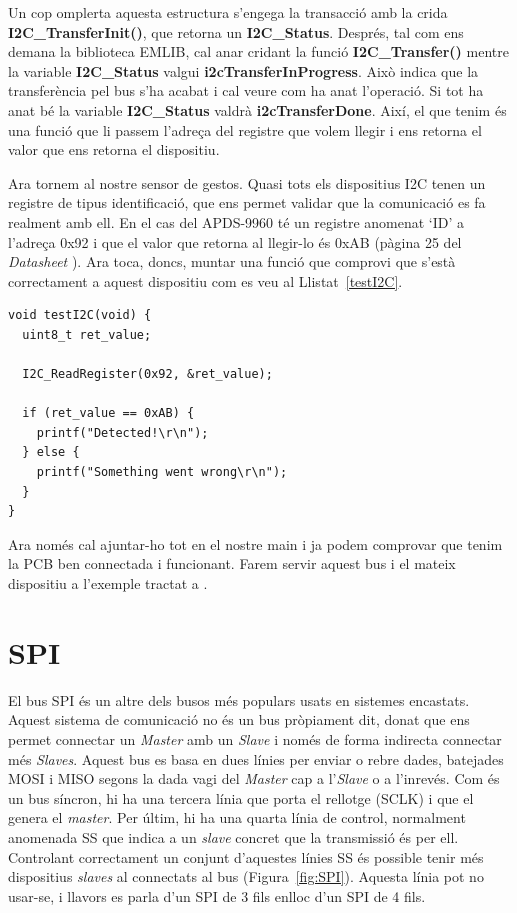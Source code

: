 Un cop omplerta aquesta estructura s'engega la transacció amb la crida {\bf I2C\_TransferInit()}, que retorna un {\bf I2C\_Status}. Després, tal com ens demana la biblioteca EMLIB, cal anar cridant la funció {\bf I2C\_Transfer()} mentre la variable {\bf I2C\_Status} valgui {\bf i2cTransferInProgress}. Això indica que la transferència pel bus s'ha acabat i cal veure com ha anat l'operació. Si tot ha anat bé la variable {\bf I2C\_Status} valdrà {\bf i2cTransferDone}. Així, el que tenim és una funció que li passem l'adreça del registre que volem llegir i ens retorna el valor que ens retorna el dispositiu.

Ara tornem al nostre sensor de gestos. Quasi tots els dispositius I2C tenen un registre de tipus identificació, que ens permet validar que la comunicació es fa realment amb ell. En el cas del APDS-9960 té un registre anomenat ‘ID' a l'adreça 0x92 i que el valor que retorna al llegir-lo és 0xAB (pàgina 25 del {\em Datasheet} \cite{apds9960}). Ara toca, doncs, muntar una funció que comprovi que s'està correctament a aquest dispositiu com es veu al Llistat~\ref{testI2C}.

\begin{lstlisting}[style=customc,caption=Funció {\bf testI2C()},label=testI2C]
void testI2C(void) {
  uint8_t ret_value;

  I2C_ReadRegister(0x92, &ret_value);

  if (ret_value == 0xAB) {
    printf("Detected!\r\n");
  } else {
    printf("Something went wrong\r\n");
  }
}
\end{lstlisting}

Ara només cal ajuntar-ho tot en el nostre main i ja podem comprovar que tenim la PCB ben connectada i funcionant. Farem servir aquest bus i el mateix dispositiu a l'exemple tractat a .


\chapter{SPI}
\label{sub:SPI}
El bus \gls{SPI} és un altre dels busos més populars usats en sistemes encastats. Aquest sistema de comunicació no és un bus pròpiament dit, donat que ens permet connectar un {\em Master} amb un {\em Slave} i només de forma indirecta connectar més {\em Slaves}.
Aquest bus es basa en dues línies per enviar o rebre dades, batejades \gls{MOSI} i \gls{MISO} segons la dada vagi del {\em Master} cap a l'{\em Slave} o a l'inrevés. Com és un bus síncron, hi ha una tercera línia que porta el rellotge (\gls{SCLK}) i que el genera el {\em master}. Per últim, hi ha una quarta línia de control, normalment anomenada \gls{SS} que indica a un {\em slave} concret que la transmissió és per ell. Controlant correctament un conjunt d'aquestes línies \gls{SS} és possible tenir més dispositius {\em slaves} al connectats al bus (Figura~\ref{fig:SPI}). Aquesta línia pot no usar-se, i llavors es parla d'un SPI de 3 fils enlloc d'un SPI de 4 fils.


